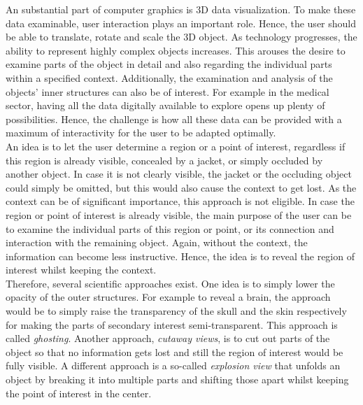 

An substantial part of computer graphics is 3D data visualization. To make these data examinable, user interaction plays an important role. Hence, the user should be able to translate, rotate and scale the 3D object. As technology progresses, the ability to represent highly complex objects increases. This arouses the desire to examine parts of the object in detail and also regarding the individual parts within a specified context. Additionally, the examination and analysis of the objects' inner structures can also be of interest. For example in the medical sector, having all the data digitally available to explore opens up plenty of possibilities. Hence, the challenge is how all these data can be provided with a maximum of interactivity for the user to be adapted optimally.\\
\newline
An idea is to let the user determine a region or a point of interest, regardless if this region is already visible, concealed by a jacket, or simply occluded by another object. In case it is not clearly visible, the jacket or the occluding object could simply be omitted, but this would also cause the context to get lost. As the context can be of significant importance, this approach is not eligible. In case the region or point of interest is already visible, the main purpose of the user can be to examine the individual parts of this region or point, or its connection and interaction with the remaining object. Again, without the context, the information can become less instructive. Hence, the idea is to reveal the region of interest whilst keeping the context.\\
\newline
Therefore, several scientific approaches exist. One idea is to simply lower the opacity of the outer structures. For example to reveal a brain, the approach would be to simply raise the transparency of the skull and the skin respectively for making the parts of secondary interest semi-transparent. This approach is called \emph{ghosting}. Another approach, \emph{cutaway views}, is to cut out parts of the object so that no information gets lost and still the region of interest would be fully visible. A different approach is a so-called \emph{explosion view} that unfolds an object by breaking it into multiple parts and shifting those apart whilst keeping the point of interest in the center.

